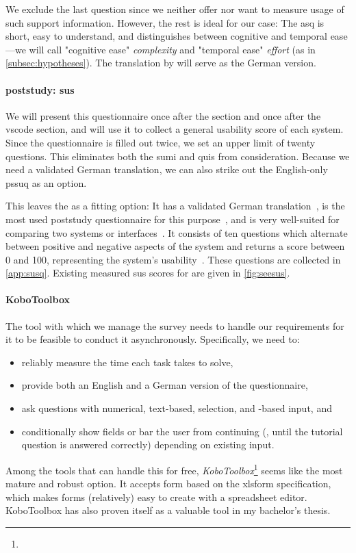 \documentclass[../thesis]{subfiles}
\begin{document}
We exclude the last question since we neither offer nor want to measure usage of such support information.
However, the rest is ideal for our case:
The \gls{asq} is short, easy to understand, and distinguishes between cognitive and temporal ease---we will call "cognitive ease" \emph{complexity} and "temporal ease" \emph{effort} (as in \cref{subsec:hypotheses}).
The translation by \textcite[32]{roegele2020} will serve as the German version.

\paragraph{\Gls{poststudy}: \gls{sus}}
We will present this questionnaire once after the \SEE{} section and once after the \gls{vscode} section, and will use it to collect a general usability score of each system.
Since the questionnaire is filled out twice, we set an upper limit of twenty questions.
This eliminates both the \gls{sumi} and \gls{quis} from consideration.
Because we need a validated German translation, we can also strike out the English-only \gls{pssuq} as an option.

This leaves the \emph{} as a fitting option:
It has a validated German translation~\cite{reinhardt2015}, is the most used \gls{poststudy} questionnaire for this purpose~\cites[1615]{sauro2009}[577]{lewis2018}, and is very well-suited for comparing two systems or interfaces~\cites[195]{peres2013}[590--591]{bangor2008}.
It consists of ten  questions which alternate between positive and negative aspects of the system and returns a score between 0 and 100, representing the system's usability~\cite{brooke1996}.
These questions are collected in \cref{app:susq}.
Existing measured \gls{sus} scores for \SEE{} are given in \cref{fig:seesus}.

\paragraph{KoboToolbox}
The tool with which we manage the survey needs to handle our requirements for it to be feasible to conduct it asynchronously.
Specifically, we need to:
\begin{itemize}
	\item reliably measure the time each task takes to solve,
	\item provide both an English and a German version of the questionnaire,
	\item ask questions with numerical, text-based, selection, and -based input, and
	\item conditionally show fields or bar the user from continuing (\eg, until the tutorial question is answered correctly) depending on existing input.
\end{itemize}
Among the tools that can handle this for free, \textit{KoboToolbox}\footnote{
} seems like the most mature and robust option.
It accepts form based on the \gls{xlsform} specification, which makes forms (relatively) easy to create with a spreadsheet editor.
KoboToolbox has also proven itself as a valuable tool in my bachelor's thesis.
\end{document}
